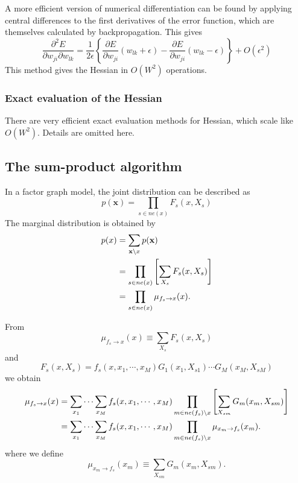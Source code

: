 \documentclass[a4paper]{report}
\renewcommand{\bf}{\mathbf}
\begin{document}
A more efficient version of numerical differentiation can be found by applying central differences to the first derivatives of the error function, which are themselves calculated by backpropagation. This gives
\begin{equation}
	\frac{\partial^2 E}{\partial w_{ji}\partial w_{lk}} = \frac{1}{2\epsilon}\left\{ \frac{\partial E}{\partial w_{ji}} (w_{lk}+\epsilon) -\frac{\partial E}{\partial w_{ji}} (w_{lk}-\epsilon)\right\} + O(\epsilon^2)
\end{equation}
This method gives the Hessian in $O(W^2)$ operations.
\subsubsection{Exact evaluation of the Hessian}
There are very efficient exact evaluation methods for Hessian, which scale like $O(W^2)$. Details are omitted here.
\subsection{The sum-product algorithm}\label{SumProd}
In a factor graph model, the joint distribution can be described as
\begin{equation}
	p(\bf{x}) = \prod_{s \in ne(x)} F_s(x,X_s)
\end{equation}
The marginal distribution is obtained by
\begin{align}
	p(x) &= \sum_{\bf{x}\backslash x} p(\bf{x}) \notag \\
	&= \prod_{s \in ne(x)} \left[ \sum_{X_s} F_s(x,X_s) \right] \notag \\
	&= \prod_{s \in ne(x)} \mu_{f_s \rightarrow x}(x).
\end{align}

From 
\begin{equation}
	\mu_{f_s \rightarrow x}(x) \equiv \sum_{X_s} F_s(x,X_s)
\end{equation}
and 
\begin{equation}
	F_s(x,X_s) = f_s(x,x_1,\cdots,x_M) G_1(x_1,X_{s1}) \cdots G_M(x_M,X_{sM})
\end{equation}
we obtain
\begin{align}
	\mu_{f_s \rightarrow x}(x) &= \sum_{x_1}\cdots \sum_{x_M} f_s(x,x_1,\cdots,x_M)\prod_{m \in ne(f_s) \backslash x}\left[\sum_{X_{sm}}G_m(x_m,X_{sm}) \right]\notag \\
	&= \sum_{x_1}\cdots \sum_{x_M} f_s(x,x_1,\cdots,x_M) \prod_{m \in ne(f_s) \backslash x}\mu_{x_m \rightarrow f_s}(x_m).
\end{align}
where we define
\begin{equation}
	\mu_{x_m \rightarrow f_s}(x_m)\equiv \sum_{X_{sm}} G_m(x_m, X_{sm}).
\end{equation}
\end{document}
